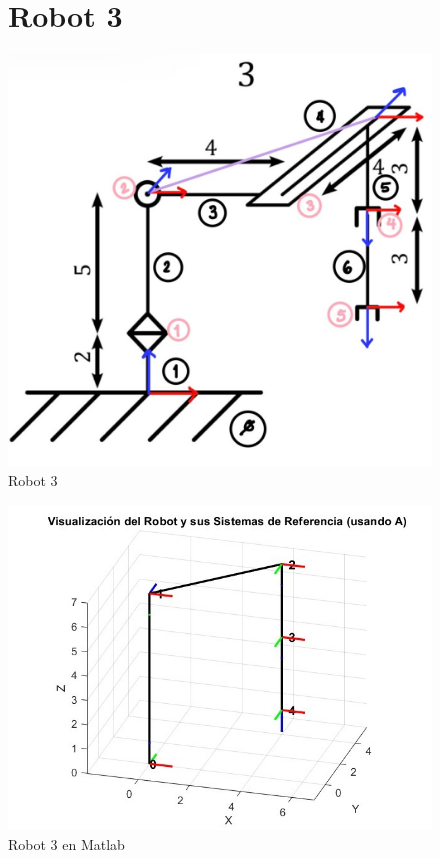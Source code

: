 \begin{figure}
	\section{Robot 3}
	\centering	\includegraphics[width=0.5\linewidth]{img/Robot3_1}
	\caption{Robot 3}
	\label{fig:robot3}
\end{figure}


\begin{figure}
	\centering	\includegraphics[width=0.7\linewidth]{img/Robot3}
	\caption{Robot 3 en Matlab}
	\label{fig:robot_3}
\end{figure}
